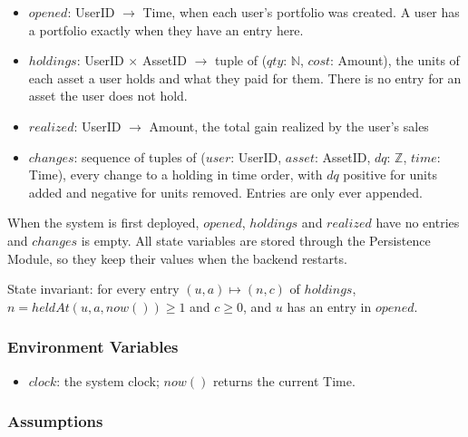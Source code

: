 \documentclass[12pt, titlepage]{article}
\begin{document}
\begin{itemize}
\item $\mathit{opened}$: UserID $\rightarrow$ Time, when each user's
  portfolio was created. A user has a portfolio exactly when they have an
  entry here.
\item $\mathit{holdings}$: UserID $\times$ AssetID $\rightarrow$ tuple of
  ($\mathit{qty}$: $\mathbb{N}$, $\mathit{cost}$: Amount), the units of each
  asset a user holds and what they paid for them. There is no entry for an
  asset the user does not hold.
\item $\mathit{realized}$: UserID $\rightarrow$ Amount, the total gain
  realized by the user's sales
\item $\mathit{changes}$: sequence of tuples of ($\mathit{user}$: UserID,
  $\mathit{asset}$: AssetID, $\mathit{dq}$: $\mathbb{Z}$, $\mathit{time}$:
  Time), every change to a holding in time order, with $\mathit{dq}$
  positive for units added and negative for units removed. Entries are only
  ever appended.
\end{itemize}

\noindent When the system is first deployed, $\mathit{opened}$,
$\mathit{holdings}$ and $\mathit{realized}$ have no entries and
$\mathit{changes}$ is empty. All state variables are stored through the
Persistence Module, so they keep their values when the backend restarts.

\medskip

\noindent State invariant: for every entry $(u, a) \mapsto (n, c)$ of
$\mathit{holdings}$, $n = \mathit{heldAt}(u, a, \mathit{now}()) \geq 1$ and
$c \geq 0$, and $u$ has an entry in $\mathit{opened}$.

\subsubsection{Environment Variables}

\begin{itemize}
\item $\mathit{clock}$: the system clock; $\mathit{now}()$ returns the
  current Time.
\end{itemize}

\subsubsection{Assumptions}
\end{document}
